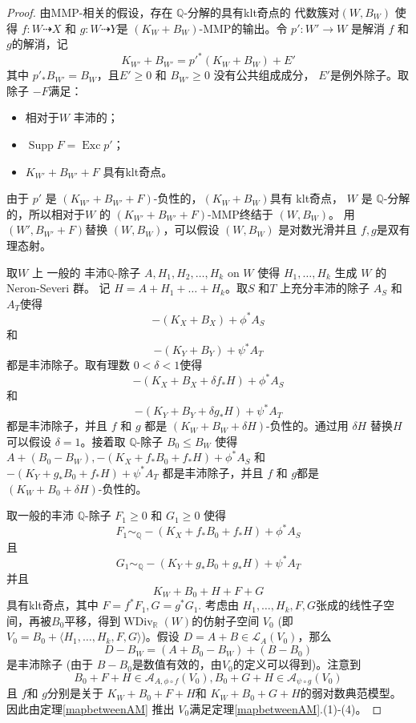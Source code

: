 \begin{proof}
  由MMP-相关的假设，存在 $\mathbb{Q}$-分解的具有klt奇点的 代数簇对$(W,B_{W})$ 使得 $f:W\dashrightarrow X$ 和 $g:W \dashrightarrow Y$是 $(K_{W}+B_{W})$-MMP的输出。令 $p':W'\to W$ 是解消 $f$ 和 $g$的解消，记
  \[ K_{W'}+B_{W'}=p'^*(K_{W}+B_{W})+E' \]
  其中  $p'_*B_{W'}=B_{W}$，且$E'\geqslant 0$ 和 $B_{W'}\geqslant 0$ 没有公共组成成分， $E'$是例外除子。取 除子 $-F$满足：
\begin{itemize}
  \item 相对于$W$ 丰沛的；
  \item $\operatorname{Supp}F=\operatorname{Exc}p'$；
  \item  $K_{W'}+B_{W'}+F$ 具有klt奇点。 
\end{itemize}
  由于 $p'$ 是 $(K_{W'}+ B_{W'}+F)$-负性的，$(K_{W}+B_{W})$具有 klt奇点， $W$ 是 $\mathbb{Q}$-分解的，所以相对于$W$ 的 $(K_{W'}+B_{W'}+F)$-MMP终结于 $(W,B_{W})$。 用 $(W',B_{W'} +F)$替换 $(W,B_{W})$，可以假设 $(W,B_{W})$ 是对数光滑并且 $f,g$是双有理态射。 

  取$W$ 上 一般的 丰沛$\mathbb{Q}$-除子 $A, H_{1},H_{2},\ldots ,H_{k}$ on $W$ 使得 $H_{1},\ldots , H_{k}$ 生成 $W$ 的 Neron-Severi 群。 记 $H=A+H_{1}+\ldots+ H_{k}$。取$S$ 和$T$ 上充分丰沛的除子 $A_{S}$ 和 $A_{T}$使得 
  \[ -(K_{X}+B_{X})+\phi^*A_{S} \]
  和
  \[ -(K_{Y}+B_{Y})+\psi^*A_{T} \]
  都是丰沛除子。取有理数 $0<\delta<1$使得 
  \[ -(K_{X}+B_{X}+\delta f_*H)+\phi^*A_{S} \]
  和
  \[-(K_{Y}+B_{Y}+\delta g_*H)+\psi^*A_{T} \]
  都是丰沛除子，并且  $f$ 和  $g$ 都是  $(K_{W}+B_{W}+\delta H)$-负性的。通过用 $\delta H$ 替换$H$可以假设 $\delta=1$。接着取 $\mathbb{Q}$-除子 $B_{0}\leqslant B_{W}$ 使得 $A+(B_{0}-B_{W}), -(K_{X}+ f_*B_{0}+f_*H)+\phi^*A_{S}$ 和 $-(K_{Y}+ g_*B_{0}+f_*H)+\psi^*A_{T}$ 都是丰沛除子，并且 $f$ 和  $g$都是  $(K_{W}+B_{0}+\delta H)$-负性的。

  取一般的丰沛 $\mathbb{Q}$-除子 $F_{1}\geqslant 0$ 和 $G_{1}\geqslant 0$ 使得 
    \[ F_{1}\sim_{\mathbb{Q}} -(K_{X}+f_*B_{0}+ f_*H)+\phi^*A_{S} \]
  且
    \[G_{1}\sim_{\mathbb{Q}} -(K_{Y}+g_*B_{0}+ g_*H)+\psi^*A_{T} \]
  并且
  \[ K_{W}+B_{0}+H+F+G \]
  具有klt奇点，其中 $F=f^*F_{1},G=g^*G_{1}$.
  考虑由 $H_{1},\ldots , H_{k},F,G$张成的线性子空间，再被$B_{0}$平移，得到$\operatorname{WDiv}_{\mathbb{R}}(W)$的仿射子空间 $V_{0}$ (即 $V_{0}=B_{0}+ \langle H_{1},\ldots ,H_{k},F,G \rangle  $)。假设 $D=A+B \in \mathcal{L}_{A}(V_{0})$，那么
  \[ D-B_W=(A+B_{0}-B_{W})+(B-B_{0}) \]
  是丰沛除子 (由于 $B-B_{0}$是数值有效的，由$V_{0}$的定义可以得到)。注意到
  \[ B_{0}+F+H \in \mathcal{A}_{A,\phi\circ f}(V_{0}), B_{0}+G+H \in \mathcal{A}_{\psi \circ g}(V_{0}) \]
  且 $f$和 $g$分别是关于  $K_{W}+B_{0}+F+H$和 $K_{W}+B_{0}+G+H$的弱对数典范模型。因此由定理\ref{mapbetweenAM} 推出 $V_{0}$满足定理\ref{mapbetweenAM}.(1)-(4)。


\end{proof}
